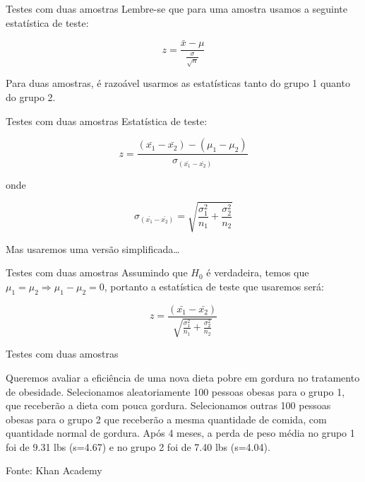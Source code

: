 \documentclass{beamer}
\begin{document}
\begin{frame}{Testes com duas amostras}
Lembre-se que para uma amostra usamos a seguinte estatística de teste:

\begin{displaymath}
  z = \frac{\bar{x} - \mu}{\frac{\sigma}{\sqrt{n}}}
\end{displaymath}

Para duas amostras, é razoável usarmos as estatísticas tanto do grupo
1 quanto do grupo 2.
\end{frame}

\begin{frame}{Testes com duas amostras}
Estatística de teste:

\begin{displaymath}
  z = \frac{ (\bar{x_1} - \bar{x_2}) - (\mu_1 - \mu_2)
  }{\sigma_{(\bar{x_1} - \bar{x_2})}}
\end{displaymath}

onde 

\begin{displaymath}
  \sigma_{(\bar{x_1} - \bar{x_2})} = \sqrt{\frac{\sigma_1^2}{n_1} + \frac{\sigma^2_2}{n_2}}
\end{displaymath}

Mas usaremos uma versão simplificada\ldots
\end{frame}

\begin{frame}{Testes com duas amostras}
  Assumindo que $H_0$ é verdadeira, temos que $\mu_1=\mu_2 \Rightarrow
  \mu_1-\mu_2 = 0$, portanto a estatística de teste que usaremos será:

\begin{displaymath}
  z = \frac{ (\bar{x_1} - \bar{x_2}) }{\sqrt{\frac{\sigma_1^2}{n_1} + \frac{\sigma^2_2}{n_2}}}
\end{displaymath}

\end{frame}

\begin{frame}{Testes com duas amostras}
  \begin{example}
    Queremos avaliar a eficiência de uma nova dieta pobre em gordura
    no tratamento de obesidade. Selecionamos aleatoriamente 100
    pessoas obesas para o grupo 1, que receberão a dieta com pouca
    gordura. Selecionamos outras 100 pessoas obesas para o grupo 2 que
    receberão a mesma quantidade de comida, com quantidade normal de
    gordura. Após 4 meses, a perda de peso média no grupo 1 foi de
    9.31 lbs (s=4.67) e no grupo 2 foi de 7.40 lbs (s=4.04).
  \end{example}
Fonte: Khan Academy
\end{frame}
\end{document}
